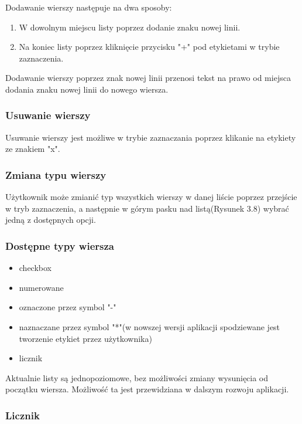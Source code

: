 Dodawanie wierszy następuje na dwa sposoby:

\begin{enumerate}
    \item W dowolnym miejscu listy poprzez dodanie znaku nowej linii.
    \item Na koniec listy poprzez kliknięcie przycisku "+" pod etykietami w trybie zaznaczenia. 
\end{enumerate}

Dodawanie wierszy poprzez znak nowej linii przenosi tekst na prawo od miejsca dodania znaku nowej linii do nowego wiersza.

\subsubsection{Usuwanie wierszy}

Usuwanie wierszy jest możliwe w trybie zaznaczania poprzez klikanie na etykiety ze znakiem "x".

\subsubsection{Zmiana typu wierszy}

Użytkownik może zmianić typ wszystkich wierszy w danej liście poprzez przejście w tryb zaznaczenia, a następnie w górym pasku nad listą(Rysunek 3.8) wybrać jedną z dostępnych opcji.

\subsubsection{Dostępne typy wiersza}

\begin{itemize}
    \item checkbox
    \item numerowane
    \item oznaczone przez symbol "\--{}"
    \item naznaczane przez symbol "*"(w nowszej wersji aplikacji spodziewane jest tworzenie etykiet przez użytkownika)
    \item licznik
\end{itemize}

Aktualnie listy są jednopoziomowe, bez możliwości zmiany wysunięcia od początku wiersza. Możliwość ta jest przewidziana w dalszym rozwoju aplikacji.

\subsubsection{Licznik}

